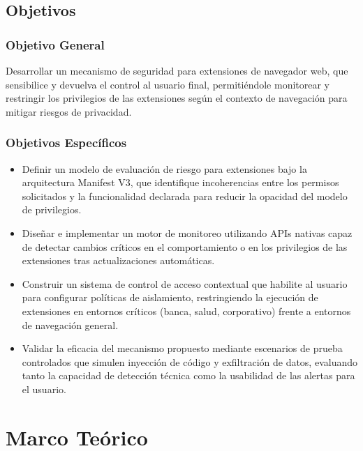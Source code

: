 \documentclass[12pt,oneside]{report}
\begin{document}
\endgroup

\section{Objetivos}
\label{sec:objetivos}
\begingroup
\setlength{\parindent}{0pt}
\setlength{\parskip}{0.6em}

\subsection{Objetivo General}
Desarrollar un mecanismo de seguridad para extensiones de navegador web, que sensibilice y devuelva el control al usuario final, permitiéndole monitorear y restringir los privilegios de las extensiones según el contexto de navegación para mitigar riesgos de privacidad.

\subsection{Objetivos Específicos}
\begin{itemize}
    \item Definir un modelo de evaluación de riesgo para extensiones bajo la arquitectura Manifest V3, que identifique incoherencias entre los permisos solicitados y la funcionalidad declarada para reducir la opacidad del modelo de privilegios.
    \item Diseñar e implementar un motor de monitoreo utilizando APIs nativas capaz de detectar cambios críticos en el comportamiento o en los privilegios de las extensiones tras actualizaciones automáticas.
    \item Construir un sistema de control de acceso contextual que habilite al usuario para configurar políticas de aislamiento, restringiendo la ejecución de extensiones en entornos críticos (banca, salud, corporativo) frente a entornos de navegación general.
    \item Validar la eficacia del mecanismo propuesto mediante escenarios de prueba controlados que simulen inyección de código y exfiltración de datos, evaluando tanto la capacidad de detección técnica como la usabilidad de las alertas para el usuario.
\end{itemize}
\endgroup



\chapter{Marco Teórico}
\begingroup
\setlength{\parindent}{0pt}
\setlength{\parskip}{0.6em}
\end{document}
